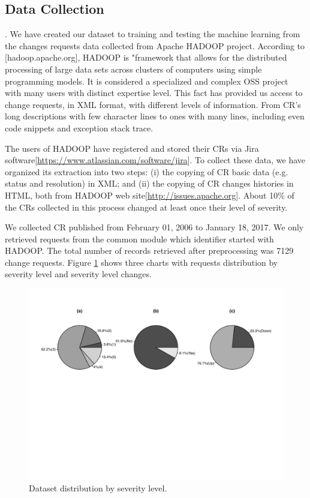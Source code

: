 \documentclass[10pt, conference]{IEEEtran}
\begin{document}
\subsection{Data Collection}. 
We have created our dataset to training and testing the machine learning from the changes requests data collected from Apache HADOOP project. According to [hadoop.apache.org], HADOOP is "framework that allows for the distributed processing of large data sets across clusters of computers using simple programming models. It is considered a specialized and complex OSS project with many users with distinct expertise level. This fact has provided us access to change requests, in XML format, with different levels of information. From CR's long descriptions with few character lines to ones with many lines, including even code snippets and exception stack trace.

The users of HADOOP have registered and stored their CRs via Jira
software[\url{https://www.atlassian.com/software/jira}]. To collect these data, we have organized its extraction into two steps: (i) the copying of CR basic data (e.g. status and resolution) in XML; and (ii) the copying of CR changes histories in HTML, both from HADOOP web site[\url{http://issues.apache.org}]. About 10\% of the CRs collected in this process changed at least once their level of severity.

We collected CR published from February 01, 2006 to January 18, 2017.  We only retrieved requests from the common module which identifier started with HADOOP. The total number of records retrieved after preprocessing was 7129 change requests. Figure \ref{fig:ds_distribution} shows three charts with requests distribution by severity level and severity level changes.

\begin{figure}[!hbt]
  \label{fig:ds_distribution}
  \includegraphics{figures/ds_distribution.pdf}
  \caption{Dataset distribution by severity level.}
\end{figure}
\end{document}
